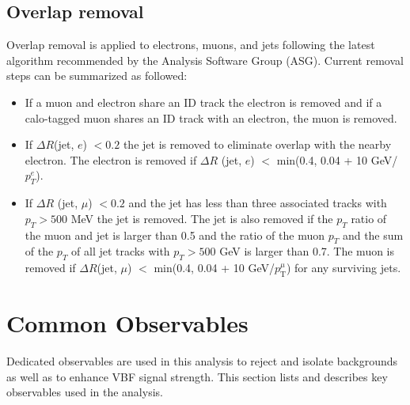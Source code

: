\subsection{Overlap removal}
Overlap removal is applied to electrons, muons, and jets following the latest algorithm recommended by the Analysis Software Group (ASG). Current removal steps can be summarized as followed:
\begin{itemize}
\item If a muon and electron share an ID track the electron is removed and if a calo-tagged muon shares an ID track with an electron, the muon is removed.
\item If $\Delta R$(jet, $e$) $< 0.2$ the jet is removed to eliminate overlap with the nearby electron. The electron is removed if $\Delta R$ (jet, $e$) $<$ min(0.4, 0.04 + 10 GeV/$p_T^e$).
\item If $\Delta R$ (jet, $\mu$) $< 0.2$ and the jet has less than three associated tracks with $p_T>500$ MeV the jet is removed. The jet is also removed if the $p_T$ ratio of the muon and jet is larger than 0.5 and the ratio of the muon $p_T$ and the sum of the $p_T$ of all jet tracks with $p_T>500$ GeV is larger than 0.7. The muon is removed if $\Delta R$(jet, $\mu$) $<$ min(0.4, 0.04 + 10 GeV/$p_\mathrm{{T}}^{\mu}$) for any surviving jets.
\end{itemize}


\section{Common Observables}

Dedicated observables are used in this analysis to reject and isolate backgrounds as well as to enhance VBF signal strength. This section lists and describes key observables used in the analysis.

